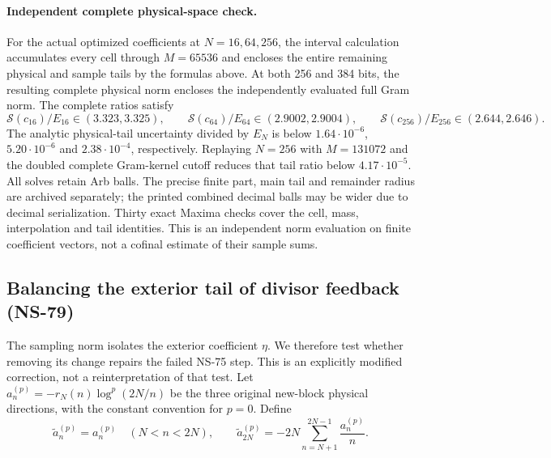 \documentclass[11pt]{article}
\theoremstyle{remark}
\begin{document}
\paragraph{Independent complete physical-space check.}
For the actual optimized coefficients at $N=16,64,256$, the interval
calculation accumulates every cell through $M=65536$ and encloses the
entire remaining physical and sample tails by the formulas above.
At both 256 and 384 bits, the resulting complete physical norm encloses
the independently evaluated full Gram norm. The complete ratios satisfy
\[
 \mathcal S(c_{16})/E_{16}\in(3.323,3.325),\qquad
 \mathcal S(c_{64})/E_{64}\in(2.9002,2.9004),\qquad
 \mathcal S(c_{256})/E_{256}\in(2.644,2.646).
\]
The analytic physical-tail uncertainty divided by $E_N$ is below
$1.64\cdot10^{-6}$, $5.20\cdot10^{-6}$ and $2.38\cdot10^{-4}$,
respectively. Replaying $N=256$ with $M=131072$ and the doubled complete
Gram-kernel cutoff reduces that tail ratio below $4.17\cdot10^{-5}$.
All solves retain Arb balls. The precise finite part, main tail and
remainder radius are archived separately; the printed combined decimal
balls may be wider due to decimal serialization. Thirty exact Maxima
checks cover the cell, mass, interpolation and tail identities.
This is an independent norm evaluation on finite coefficient vectors,
not a cofinal estimate of their sample sums.

\subsection{Balancing the exterior tail of divisor feedback (NS-79)}
\label{sec:ns79-balanced-feedback}

The sampling norm isolates the exterior coefficient $\eta$. We therefore
test whether removing its change repairs the failed NS-75 step. This is
an explicitly modified correction, not a reinterpretation of that test.
Let $a_n^{(p)}=-r_N(n)\log^p(2N/n)$ be the three original new-block
physical directions, with the constant convention for $p=0$. Define
\begin{equation}
 \widetilde a_n^{(p)}=a_n^{(p)}\quad(N<n<2N),\qquad
 \widetilde a_{2N}^{(p)}=-2N\sum_{n=N+1}^{2N-1}\frac{a_n^{(p)}}n.
 \label{eq:ns79-balance}
\end{equation}
\end{document}
